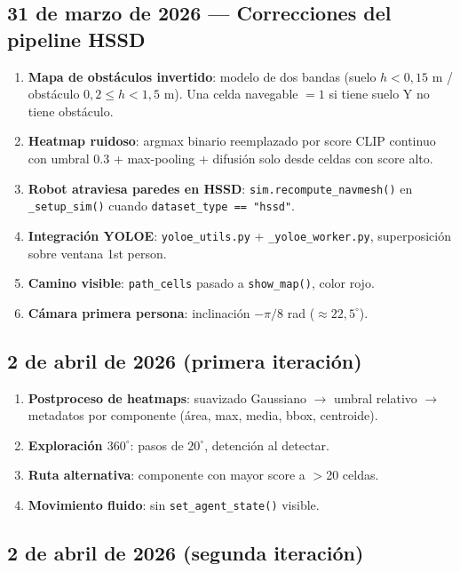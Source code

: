 \documentclass[11pt,a4paper]{article}
\begin{document}
\subsection*{31 de marzo de 2026 --- Correcciones del pipeline HSSD}

\begin{enumerate}
  \item \textbf{Mapa de obstáculos invertido}: modelo de dos bandas (suelo $h<0{,}15$ m /
        obstáculo $0{,}2 \leq h < 1{,}5$ m). Una celda navegable $= 1$ si tiene suelo Y
        no tiene obstáculo.
  \item \textbf{Heatmap ruidoso}: argmax binario reemplazado por score CLIP continuo con
        umbral 0.3 + max-pooling + difusión solo desde celdas con score alto.
  \item \textbf{Robot atraviesa paredes en HSSD}: \texttt{sim.recompute\_navmesh()} en
        \texttt{\_setup\_sim()} cuando \texttt{dataset\_type == "hssd"}.
  \item \textbf{Integración YOLOE}: \texttt{yoloe\_utils.py} + \texttt{\_yoloe\_worker.py},
        superposición sobre ventana 1st person.
  \item \textbf{Camino visible}: \texttt{path\_cells} pasado a \texttt{show\_map()},
        color rojo.
  \item \textbf{Cámara primera persona}: inclinación $-\pi/8$ rad ($\approx 22{,}5^\circ$).
\end{enumerate}

\subsection*{2 de abril de 2026 (primera iteración)}

\begin{enumerate}
  \item \textbf{Postproceso de heatmaps}: suavizado Gaussiano $\rightarrow$ umbral
        relativo $\rightarrow$ metadatos por componente (área, max, media, bbox, centroide).
  \item \textbf{Exploración $360^\circ$}: pasos de $20^\circ$, detención al detectar.
  \item \textbf{Ruta alternativa}: componente con mayor score a $>$20 celdas.
  \item \textbf{Movimiento fluido}: sin \texttt{set\_agent\_state()} visible.
\end{enumerate}

\subsection*{2 de abril de 2026 (segunda iteración)}
\end{document}
